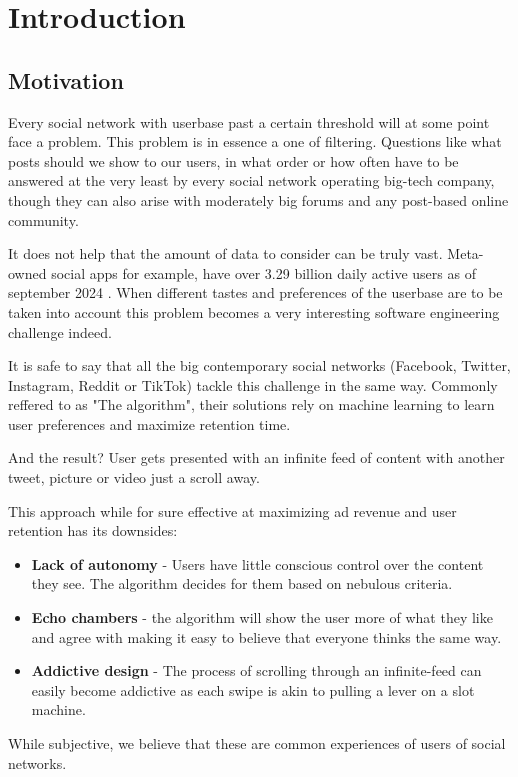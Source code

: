 \chapter*{Introduction}

\section*{Motivation}

Every social network with userbase past a certain threshold will at some point face a problem.
This problem is in essence a one of filtering.
Questions like what posts should we show to our users, in what order or how often have to be answered at the very least by every social network operating big-tech company,
though they can also arise with moderately big forums and any post-based online community. 

It does not help that the amount of data to consider can be truly vast.
Meta-owned social apps for example, have over 3.29 billion daily active users as of september 2024 \cite{meta_dau}.
When different tastes and preferences of the userbase are to be taken into account
this problem becomes a very interesting software engineering challenge indeed.

It is safe to say that all the big contemporary social networks (Facebook, Twitter, Instagram, Reddit or TikTok)
tackle this challenge in the same way.
Commonly reffered to as "The algorithm",
their solutions rely on machine learning to learn user preferences and maximize retention time.

And the result? User gets presented with an infinite feed of content
with another tweet, picture or video just a scroll away.

This approach while for sure effective at maximizing ad revenue and user retention has its downsides:
\begin{itemize}
  \item \textbf{Lack of autonomy} - Users have little conscious control over the content they see. The algorithm decides for them based on nebulous criteria.
  \item \textbf{Echo chambers} - the algorithm will show the user more of what they like and agree with making it easy to believe that
  everyone thinks the same way.
  \item \textbf{Addictive design} - The process of scrolling through an infinite-feed can easily become addictive as each swipe is akin to pulling a lever on a slot machine.
\end{itemize}
While subjective, we believe that these are common experiences of users of social networks.

